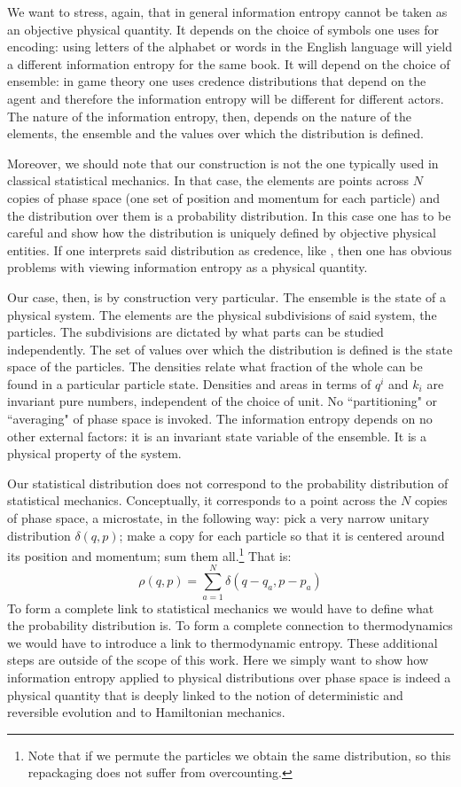 \documentclass[11pt]{article}
\begin{document}
We want to stress, again, that in general information entropy cannot be taken as an objective physical quantity. It depends on the choice of symbols one uses for encoding: using letters of the alphabet or words in the English language will yield a different information entropy for the same book. It will depend on the choice of ensemble: in game theory one uses credence distributions that depend on the agent and therefore the information entropy will be different for different actors. The nature of the information entropy, then, depends on the nature of the elements, the ensemble and the values over which the distribution is defined.

Moreover, we should note that our construction is not the one typically used in classical statistical mechanics. In that case, the elements are points across $N$ copies of phase space (one set of position and momentum for each particle) and the distribution over them is a probability distribution. In this case one has to be careful and show how the distribution is uniquely defined by objective physical entities. If one interprets said distribution as credence, like \cite{Jaynes}, then one has obvious problems with viewing information entropy as a physical quantity.

Our case, then, is by construction very particular. The ensemble is the state of a physical system. The elements are the physical subdivisions of said system, the particles. The subdivisions are dictated by what parts can be studied independently. The set of values over which the distribution is defined is the state space of the particles. The densities relate what fraction of the whole can be found in a particular particle state. Densities and areas in terms of $q^i$ and $k_i$ are invariant pure numbers, independent of the choice of unit. No ``partitioning" or ``averaging" of phase space is invoked. The information entropy depends on no other external factors: it is an invariant state variable of the ensemble. It is a physical property of the system.

Our statistical distribution does not correspond to the probability distribution of statistical mechanics. Conceptually, it corresponds to a point across the $N$ copies of phase space, a microstate, in the following way: pick a very narrow unitary distribution $\delta(q,p)$; make a copy for each particle so that it is centered around its position and momentum; sum them all.\footnote{Note that if we permute the particles we obtain the same distribution, so this repackaging does not suffer from overcounting.} That is:
\begin{equation}
\rho(q,p) = \sum\limits_{a=1}^N \delta(q - q_a, p - p_a)
\end{equation}
To form a complete link to statistical mechanics we would have to define what the probability distribution is. To form a complete connection to thermodynamics we would have to introduce a link to thermodynamic entropy. These additional steps are outside of the scope of this work. Here we simply want to show how information entropy applied to physical distributions over phase space is indeed a physical quantity that is deeply linked to the notion of deterministic and reversible evolution and to Hamiltonian mechanics.
\end{document}
